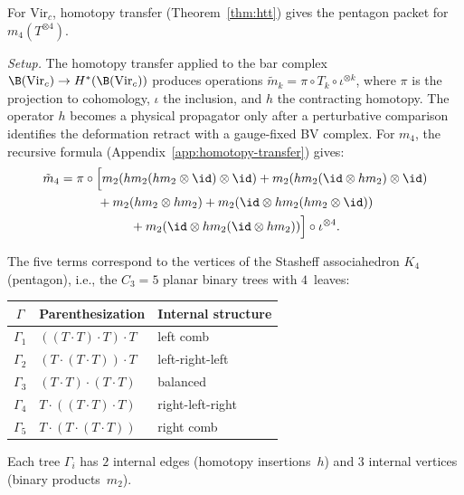 \begin{computation}
\label{comp:v1-virasoro-m4}
For $\mathrm{Vir}_c$, homotopy transfer
(Theorem~\ref{thm:htt}) gives the pentagon packet for
$m_4(T^{\otimes 4})$.

\emph{Setup.}
The homotopy transfer applied to the bar complex
$\B(\mathrm{Vir}_c) \to H^*(\B(\mathrm{Vir}_c))$
produces operations $\tilde{m}_k = \pi \circ T_k \circ \iota^{\otimes k}$,
where $\pi$ is the projection to cohomology, $\iota$ the inclusion,
and $h$ the contracting homotopy.  The operator $h$ becomes a physical
propagator only after a perturbative comparison identifies the
deformation retract with a gauge-fixed BV complex.
For $m_4$, the recursive formula
(Appendix~\ref{app:homotopy-transfer}) gives:
\begin{multline}\label{eq:m4-transfer}
\tilde{m}_4 = \pi \circ \Bigl[
m_2(hm_2(hm_2 \otimes \id)\otimes \id) +
m_2(hm_2(\id \otimes hm_2)\otimes \id) \\
{} + m_2(hm_2 \otimes hm_2) +
m_2(\id \otimes hm_2(hm_2 \otimes \id)) \\
{} + m_2(\id \otimes hm_2(\id \otimes hm_2))
\Bigr] \circ \iota^{\otimes 4}.
\end{multline}

The five terms correspond to the vertices of the Stasheff
associahedron $K_4$ (pentagon), i.e., the $C_3 = 5$ planar binary
trees with $4$~leaves:
\begin{center}
\renewcommand{\arraystretch}{1.3}
\begin{tabular}{cll}
\toprule
$\Gamma$ & Parenthesization & Internal structure \\
\midrule
$\Gamma_1$ & $((T \cdot T) \cdot T) \cdot T$ & left comb \\
$\Gamma_2$ & $(T \cdot (T \cdot T)) \cdot T$ & left-right-left \\
$\Gamma_3$ & $(T \cdot T) \cdot (T \cdot T)$ & balanced \\
$\Gamma_4$ & $T \cdot ((T \cdot T) \cdot T)$ & right-left-right \\
$\Gamma_5$ & $T \cdot (T \cdot (T \cdot T))$ & right comb \\
\bottomrule
\end{tabular}
\end{center}
Each tree $\Gamma_i$ has $2$ internal edges (homotopy insertions~$h$)
and $3$ internal vertices (binary products~$m_2$).


\end{computation}

